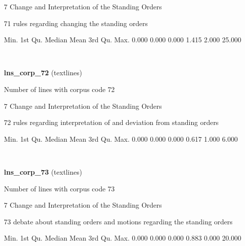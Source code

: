 \documentclass[]{article}
\newenvironment{Shaded}{\begin{snugshade}}{\end{snugshade}}
\newcommand{\FloatTok}[1]{\textcolor[rgb]{0.00,0.00,0.81}{{#1}}}
\newcommand{\NormalTok}[1]{{#1}}
\begin{document}
7 Change and Interpretation of the Standing Orders

71 rules regarding changing the standing orders

\begin{Shaded}
\begin{Highlighting}[]
   \NormalTok{Min. 1st Qu.  Median    Mean 3rd Qu.    Max. }
  \FloatTok{0.000}   \FloatTok{0.000}   \FloatTok{0.000}   \FloatTok{1.415}   \FloatTok{2.000}  \FloatTok{25.000} 
\end{Highlighting}
\end{Shaded}

~

\vspace{1em}

\textbf{lns\_corp\_72} (textlines)

Number of lines with corpus code 72

7 Change and Interpretation of the Standing Orders

72 rules regarding interpretation of and deviation from standing orders

\begin{Shaded}
\begin{Highlighting}[]
   \NormalTok{Min. 1st Qu.  Median    Mean 3rd Qu.    Max. }
  \FloatTok{0.000}   \FloatTok{0.000}   \FloatTok{0.000}   \FloatTok{0.617}   \FloatTok{1.000}   \FloatTok{6.000} 
\end{Highlighting}
\end{Shaded}

~

\vspace{1em}

\textbf{lns\_corp\_73} (textlines)

Number of lines with corpus code 73

7 Change and Interpretation of the Standing Orders

73 debate about standing orders and motions regarding the standing
orders

\begin{Shaded}
\begin{Highlighting}[]
   \NormalTok{Min. 1st Qu.  Median    Mean 3rd Qu.    Max. }
  \FloatTok{0.000}   \FloatTok{0.000}   \FloatTok{0.000}   \FloatTok{0.883}   \FloatTok{0.000}  \FloatTok{20.000} 
\end{Highlighting}
\end{Shaded}

~

\vspace{1em}
\end{document}
